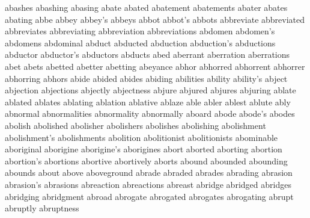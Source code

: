 \documentclass [PhD] {uclathes}
\begin{document}
abashes
abashing
abasing
abate
abated
abatement
abatements
abater
abates
abating
abbe
abbey
abbey's
abbeys
abbot
abbot's
abbots
abbreviate
abbreviated
abbreviates
abbreviating
abbreviation
abbreviations
abdomen
abdomen's
abdomens 
abdominal
abduct
abducted 
abduction
abduction's
abductions
abductor
abductor's
abductors
abducts
abed
aberrant
aberration
aberrations
abet
abets
abetted
abetter
abetting
abeyance
abhor
abhorred
abhorrent
abhorrer
abhorring
abhors
abide
abided
abides
abiding
abilities
ability
ability's
abject
abjection
abjections
abjectly
abjectness
abjure
abjured
abjures
abjuring
ablate
ablated
ablates
ablating
ablation
ablative
ablaze
able
abler
ablest
ablute
ably
abnormal
abnormalities
abnormality
abnormally
aboard
abode
abode's
abodes
abolish
abolished
abolisher
abolishers
abolishes
abolishing
abolishment
abolishment's
abolishments
abolition
abolitionist
abolitionists
abominable
aboriginal
aborigine
aborigine's
aborigines
abort
aborted
aborting
abortion
abortion's
abortions
abortive
abortively
aborts
abound
abounded
abounding
abounds
about
above
aboveground
abrade
abraded
abrades
abrading
abrasion
abrasion's
abrasions
abreaction
abreactions
abreast
abridge
abridged
abridges
abridging
abridgment
abroad
abrogate
abrogated
abrogates
abrogating
abrupt
abruptly
abruptness
\end{document}
